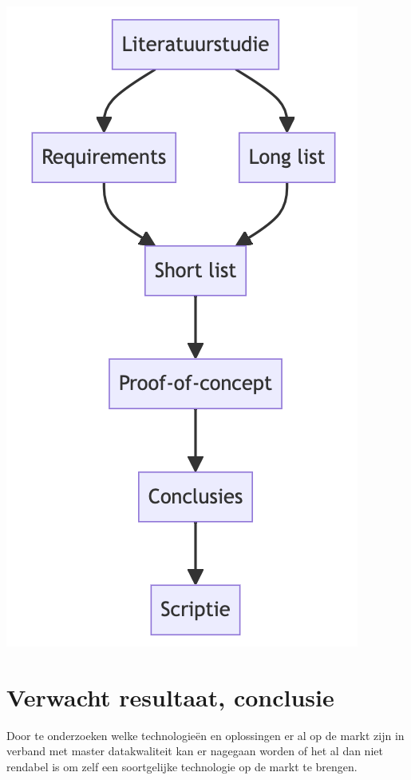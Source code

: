 \begin{center}
\includegraphics[scale=0.5]{methodologie.png}
\end{center}

\section{Verwacht resultaat, conclusie}%
\label{sec:verwachte_resultaten}

Door te onderzoeken welke technologieën en oplossingen er al op de markt zijn in verband met master datakwaliteit kan er nagegaan worden of het al dan niet rendabel is om zelf een soortgelijke technologie op de markt te brengen. 

